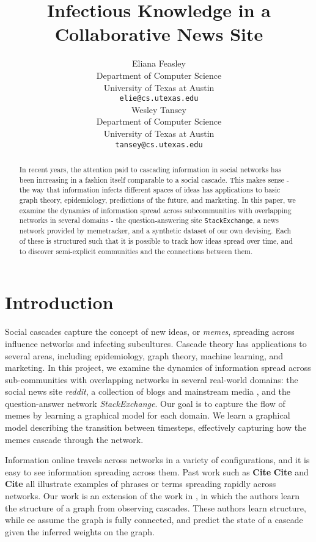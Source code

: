 \documentclass{article} %
\title{Infectious Knowledge in a Collaborative News Site}
\author{
Eliana Feasley\\
Department of Computer Science\\
University of Texas at Austin\\
\texttt{elie@cs.utexas.edu} \\
\And
Wesley Tansey\\
Department of Computer Science\\
University of Texas at Austin\\
\texttt{tansey@cs.utexas.edu} \\
}
\def\c{\textbf{ Cite }}
\begin{document}
\maketitle

\begin{abstract}
In recent years, the attention paid to cascading information in social networks has been increasing in a fashion itself comparable to a social cascade. This makes sense - the way that information infects different spaces of ideas has applications to basic graph theory, epidemiology, predictions of the future, and marketing. In this paper, we examine the dynamics of information spread across subcommunities with overlapping networks in several domains - the question-answering site \texttt{StackExchange}, a news network provided by memetracker, and a synthetic dataset of our own devising. Each of these is structured such that it is possible to track how ideas spread over time, and to discover semi-explicit communities and the connections between them.
\end{abstract}

\section{Introduction}
\label{intro}
Social cascades capture the concept of new ideas, or \textit{memes}, spreading across influence networks and infecting subcultures. Cascade theory has applications to several areas, including epidemiology, graph theory, machine learning, and marketing. In this project, we examine the dynamics of information spread across sub-communities with overlapping networks in several real-world domains: the social news site \textit{reddit}, a collection of blogs and mainstream media \cite{memetracker}, and the question-answer network \textit{StackExchange}. Our goal is to capture the flow of memes by learning a graphical model for each domain. We learn a graphical model describing the transition between timesteps, effectively capturing how the memes cascade through the network.

Information online travels across networks in a variety of configurations, and it is easy to see information spreading across them. Past work such as \c \c and \c all illustrate examples of phrases or terms spreading rapidly across networks.
Our work is an extension of the work in \cite{netinf}, in which the authors learn the structure of a graph from observing cascades. These authors learn structure, while ee assume the graph is fully connected, and predict the state of a cascade given the inferred weights on the graph. 
\end{document}
